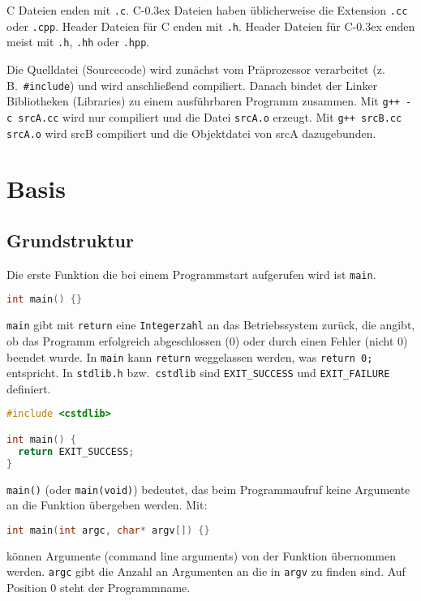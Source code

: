 \documentclass[10pt,twocolumn]{scrartcl}
\newcommand*\cpp{C\kern-0.3ex\raisebox{0.17ex}{\texttt{+\kern-0.3ex+}}}
\begin{document}
C Dateien enden mit \lstinline|.c|. \cpp{} Dateien haben üblicherweise die
Extension \lstinline|.cc| oder \lstinline|.cpp|. Header Dateien für C enden mit
\lstinline|.h|. Header Dateien für \cpp{} enden meist mit \lstinline|.h|,
\lstinline|.hh| oder \lstinline|.hpp|.

Die Quelldatei (Sourcecode) wird zunächst vom Präprozessor verarbeitet (z.\,B.\
\lstinline|#include|) und wird anschließend compiliert. Danach bindet der Linker
Bibliotheken (Libraries) zu einem ausführbaren Programm zusammen. Mit
\lstinline|g++ -c srcA.cc| wird nur compiliert und die Datei \lstinline|srcA.o|
erzeugt. Mit \lstinline|g++ srcB.cc srcA.o| wird srcB compiliert und die
Objektdatei von srcA dazugebunden.

\section{Basis}
\label{sec:einleitung}

\subsection{Grundstruktur}

Die erste Funktion die bei einem Programmstart aufgerufen wird ist
\lstinline|main|.
\begin{lstlisting}[language=C++]
int main() {}
\end{lstlisting}
\lstinline|main| gibt mit \lstinline|return| eine \lstinline|Integerzahl| an das
Betriebssystem zurück, die angibt, ob das Programm erfolgreich abgeschlossen (0)
oder durch einen Fehler (nicht 0) beendet wurde. In \lstinline|main| kann
\lstinline|return| weggelassen werden, was \lstinline|return 0;| entspricht. In
\lstinline|stdlib.h| bzw.\ \lstinline|cstdlib| sind \lstinline|EXIT_SUCCESS| und
\lstinline|EXIT_FAILURE| definiert.
\begin{lstlisting}[language=C++]
#include <cstdlib>

int main() {
  return EXIT_SUCCESS;
}
\end{lstlisting}
\lstinline|main()| (oder \lstinline|main(void)|) bedeutet, das beim
Programmaufruf keine Argumente an die Funktion übergeben werden. Mit:
\begin{lstlisting}[language=C++]
int main(int argc, char* argv[]) {}
\end{lstlisting}
können Argumente (command line arguments) von der Funktion übernommen werden.
\lstinline|argc| gibt die Anzahl an Argumenten an die in \lstinline|argv| zu
finden sind. Auf Position 0 steht der Programmname.
\end{document}
